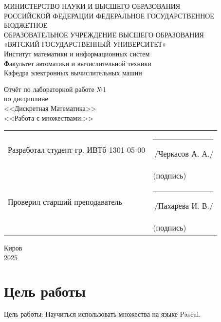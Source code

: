 \documentclass[oneside,a4paper,14pt]{extarticle}
\begin{document}
\newpage
\thispagestyle{empty}
\begin{center}
	МИНИСТЕРСТВО НАУКИ И ВЫСШЕГО ОБРАЗОВАНИЯ\\
	РОССИЙСКОЙ ФЕДЕРАЦИИ
	ФЕДЕРАЛЬНОЕ ГОСУДАРСТВЕННОЕ БЮДЖЕТНОЕ\\
	ОБРАЗОВАТЕЛЬНОЕ
	УЧРЕЖДЕНИЕ ВЫСШЕГО ОБРАЗОВАНИЯ\\
	«ВЯТСКИЙ ГОСУДАРСТВЕННЫЙ УНИВЕРСИТЕТ»\\
	Институт математики и информационных систем\\
	Факультет автоматики и вычислительной техники\\
	Кафедра электронных вычислительных машин
\end{center}
\vspace{20mm}

\begin{center}
	Отчёт по лабораторной работе №1\\
	по дисциплине\\
	<<Дискретная Математика>>\\
	<<Работа с множествами.>>\\
\end{center}
\vspace{40mm}
\noindent
\begin{tabular}{ll}
	Разработал студент гр. ИВТб-1301-05-00 & \rule[-1mm]{30mm}{0.10mm}\,/Черкасов А. А./ \\
	                                       & \hspace{8mm}\footnotesize(подпись)          \\

	Проверил старший преподаватель         & \rule[-1mm]{30mm}{0.10mm}\,/Пахарева И. В./ \\
	                                       & \hspace{8mm}\footnotesize(подпись)          \\
\end{tabular}

\vfill
\begin{center}
	Киров\\
	2025
\end{center}

\newpage\thispagestyle{plain}
\section*{Цель работы}
Цель работы: Научиться использовать множества на языке Pascal.\\
\end{document}

